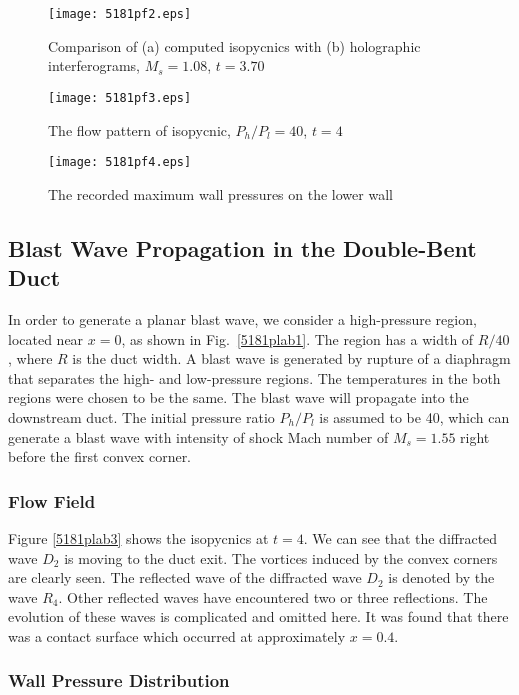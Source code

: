 \documentclass[runningheads]{svmult}
\begin{document}
%
\begin{figure}[h]
\begin{minipage}{0.48\textwidth}
  \texttt{[image: 5181pf2.eps]}
  \caption{Comparison of (a) computed isopycnics with (b) holographic interferograms, $M_s=1.08$, $t=3.70$}
\label{5181plab2}
\end{minipage}  
\hfil
\begin{minipage}[t]{0.48\textwidth}
\vspace*{-50mm}
  \texttt{[image: 5181pf3.eps]}
  \caption{The flow pattern of isopycnic, \(P_h/P_l=40\), $t=4$}
\label{5181plab3}
\texttt{[image: 5181pf4.eps]}
\caption{The recorded maximum wall pressures on the lower wall}
\label{5181plab4}
\end{minipage}
\end{figure}
%

\subsection{Blast Wave Propagation in the Double-Bent Duct}

   In order to generate a planar blast wave, we consider a high-pressure region, located near \(x=0\), as shown in Fig.~\ref{5181plab1}. The region has a width of $R/40$, where $R$ is the duct width. A blast wave is generated by rupture of a diaphragm that separates the high- and  low-pressure regions. The temperatures in the both regions were chosen to be the same. The blast wave will propagate into the downstream duct. The initial pressure ratio \(P_h / P_l\) is assumed to be 40, which can generate a blast wave with intensity of shock Mach number of \(M_s=1.55\)  right before the first convex corner.

\subsubsection*{Flow Field}

   Figure \ref{5181plab3} shows the isopycnics at $t=4$. We can see that the diffracted wave $D_2$ is moving to the duct exit. The vortices induced by the convex corners are clearly seen. The reflected wave of the diffracted wave $D_2$ is denoted by the wave \(R_4\). Other reflected waves have encountered two or three reflections. The evolution of these waves is complicated and omitted here. It was found that there was a contact surface which occurred at approximately \(x=0.4\).

\subsubsection*{Wall Pressure Distribution}
\end{document}
